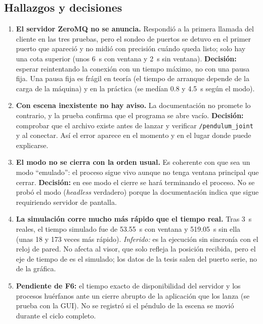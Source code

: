 \documentclass[12pt,letterpaper]{article}
\newcommand{\cod}[1]{\texttt{\detokenize{#1}}}
\begin{document}
\subsection{Hallazgos y decisiones}

\begin{enumerate}
    \item \textbf{El servidor ZeroMQ no se anuncia.} Respondió a la primera llamada del cliente en las tres pruebas, pero el sondeo de puertos se detuvo en el primer puerto que apareció y no midió con precisión cuándo queda listo; solo hay una cota superior (unos 6~s con ventana y 2~s sin ventana). \textbf{Decisión:} esperar reintentando la conexión con un tiempo máximo, no con una pausa fija. Una pausa fija es frágil en teoría (el tiempo de arranque depende de la carga de la máquina) y en la práctica (se medían 0.8 y 4.5~s según el modo).
    \item \textbf{Con escena inexistente no hay aviso.} La documentación no promete lo contrario, y la prueba confirma que el programa se abre vacío. \textbf{Decisión:} comprobar que el archivo existe antes de lanzar y verificar \texttt{/pendulum\_joint} y \cod{/graph} al conectar. Así el error aparece en el momento y en el lugar donde puede explicarse.
    \item \textbf{El modo \cod{-h} no se cierra con la orden usual.} Es coherente con que sea un modo ``emulado'': el proceso sigue vivo aunque no tenga ventana principal que cerrar. \textbf{Decisión:} en ese modo el cierre se hará terminando el proceso. No se probó el modo \cod{-H} (\textit{headless} verdadero) porque la documentación indica que sigue requiriendo servidor de pantalla.
    \item \textbf{La simulación corre mucho más rápido que el tiempo real.} Tras 3~s reales, el tiempo simulado fue de 53.55~s con ventana y 519.05~s sin ella (unas 18 y 173 veces más rápido). \textit{Inferido:} es la ejecución sin sincronía con el reloj de pared. No afecta al visor, que solo refleja la posición recibida, pero el eje de tiempo de \cod{/graph} es el simulado; los datos de la tesis salen del puerto serie, no de la gráfica.
    \item \textbf{Pendiente de F6:} el tiempo exacto de disponibilidad del servidor y los procesos huérfanos ante un cierre abrupto de la aplicación que los lanza (se prueba con la GUI). No se registró si el péndulo de la escena se movió durante el ciclo completo.
\end{enumerate}

\end{document}
